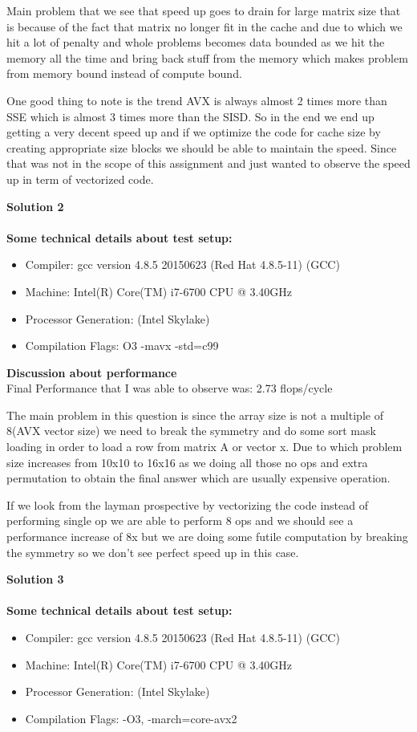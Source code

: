 \documentclass[letterpaper, 11pt]{article}
\begin{document}
Main problem that we see that speed up goes to drain for large matrix size that is because of the fact that matrix no longer fit in the cache and due to which we hit a lot of penalty and whole problems becomes data bounded as we hit the memory all the time and bring back stuff from the memory which makes problem from memory bound instead of compute bound. 

One good thing to note is the trend AVX is always almost 2 times more than SSE which is almost 3 times more than the SISD. So in the end we end up getting a very decent speed up and if we optimize the code for cache size by creating appropriate size blocks we should be able to maintain the speed. Since that was not in the scope of this assignment and just wanted to observe the speed up in term of vectorized code.
\bigskip

\textbf{Solution 2}\\ \\
\textbf{Some technical details about test setup:}
\begin{itemize}
\item Compiler: gcc version 4.8.5 20150623 (Red Hat 4.8.5-11) (GCC) 
\item Machine:  Intel(R) Core(TM) i7-6700 CPU @ 3.40GHz
\item Processor Generation: (Intel Skylake)
\item Compilation Flags: O3 -mavx -std=c99
\end{itemize}
\textbf{Discussion about performance}\\
Final Performance that I was able to observe was: 2.73 flops/cycle

The main problem in this question is since the array size is not a multiple of 8(AVX vector size) we need to break the symmetry and do some sort mask loading in order to load a row from matrix A or vector x. Due to which problem size increases from 10x10 to 16x16 as we doing all those no ops and extra permutation to obtain the final answer which are usually expensive operation.

If we look from the layman prospective by vectorizing the code instead of performing single op we are able to perform 8 ops and we should see a performance increase of 8x but we are doing some futile computation by breaking the symmetry so we don't see perfect speed up in this case.
\bigskip

\textbf{Solution 3}\\ \\
\textbf{Some technical details about test setup:}
\begin{itemize}
\item Compiler: gcc version 4.8.5 20150623 (Red Hat 4.8.5-11) (GCC) 
\item Machine:  Intel(R) Core(TM) i7-6700 CPU @ 3.40GHz
\item Processor Generation: (Intel Skylake)
\item Compilation Flags: -O3, -march=core-avx2
\end{itemize}
\end{document}
